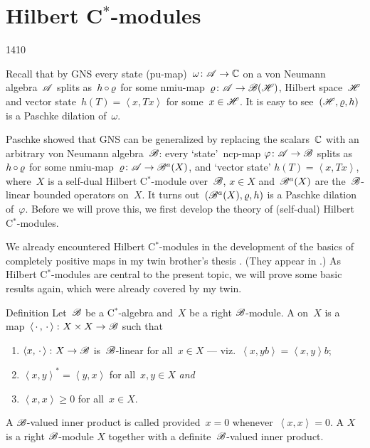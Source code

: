 \section{Hilbert C$^*$-modules}
\begin{parsec}{1410}%
\begin{point}{10}%
Recall that by GNS
    every state (pu-map)~$\omega\colon \mathscr{A} \to \mathbb{C}$
    on a von Neumann algebra~$\mathscr{A}$
    splits as~$h \mathop{\circ} \varrho$
    for some nmiu-map~$\varrho\colon \mathscr{A} \to \mathscr{B}(\mathscr{H})$,
        Hilbert space~$\mathscr{H}$
        and vector state~$h (T) =  \left<x, T x\right>$
         for some~$x \in \mathscr{H}$.
It is easy to see~$(\mathscr{H}, \varrho, h)$ is a Paschke dilation of~$\omega$.


Paschke showed that GNS can be generalized by replacing the scalars~$\mathbb{C}$
    with an arbitrary von Neumann algebra~$\mathscr{B}$:
    every `state'~ncp-map $\varphi\colon \mathscr{A} \to \mathscr{B}$
    splits as~$h \mathop{\circ} \varrho$
    for some nmiu-map~$\varrho\colon \mathscr{A} \to \mathscr{B}^a (X)$,
    and `vector state' $h(T) = \left<x, Tx\right>$,
    where~$X$ is a self-dual Hilbert C$^*$-module over~$\mathscr{B}$, $x \in X$
     and~$\mathscr{B}^a(X)$ are the~$\mathscr{B}$-linear bounded operators on~$X$.
It turns out~$(\mathscr{B}^a(X), \varrho, h)$
    is a Paschke dilation of~$\varphi$.
Before we will prove this,
    we first develop the theory of (self-dual) Hilbert C$^*$-modules.

We already encountered Hilbert C$^*$-modules
    in the development of the basics of completely positive maps
    in my twin brother's thesis \cite{bram}.
(They appear in .)
As Hilbert C$^*$-modules are central to the present topic,
    we will prove some basic results again, which were already
    covered by my twin.
\end{point}
\begin{point}{20}{Definition}%
    Let~$\mathscr{B}$ be a C$^*$-algebra and~$X$
        be a right $\mathscr{B}$-module.
        A 
            on~$X$
        is a map~$\left<\,\cdot\,,\,\cdot\,\right>\colon X \times X \to \mathscr{B}$
        such that
        \begin{enumerate}
            \item $\left<x, \,\cdot\,\right> \colon X \to  \mathscr{B}$
                    is~$\mathscr{B}$-linear for all~$x \in X$
                    --- viz.~$\left< x, yb\right> = \left<x, y\right>b$;
            \item $\left<x,y\right>^* = \left<y,x\right>$
                for all~$x,y\in X$ \emph{and}
            \item $\left<x,x\right> \geq 0$ for all~$x \in X$.
        \end{enumerate}
        A $\mathscr{B}$-valued inner product is called 
        provided~$x = 0$ whenever~$\left<x,x\right>=0$.
        A  $X$
        is a right $\mathscr{B}$-module $X$
        together with a definite~$\mathscr{B}$-valued inner product.


\end{point}
\end{parsec}

